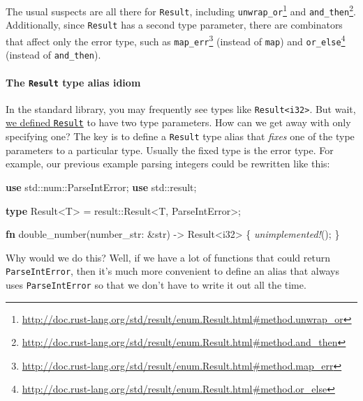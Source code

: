 \documentclass[a4paper,]{book}
\newenvironment{Shaded}{\begin{snugshade}}{\end{snugshade}}
\newcommand{\KeywordTok}[1]{\textcolor[rgb]{0.13,0.29,0.53}{\textbf{{#1}}}}
\newcommand{\DataTypeTok}[1]{\textcolor[rgb]{0.13,0.29,0.53}{{#1}}}
\newcommand{\PreprocessorTok}[1]{\textcolor[rgb]{0.56,0.35,0.01}{\textit{{#1}}}}
\newcommand{\NormalTok}[1]{{#1}}
\renewcommand{\href}[2]{#2\footnote{\url{#1}}}
\let\oldparagraph\paragraph
\renewcommand{\paragraph}[1]{\oldparagraph{#1}\mbox{}}
\begin{document}
The usual suspects are all there for \texttt{Result}, including
\href{http://doc.rust-lang.org/std/result/enum.Result.html\#method.unwrap_or}{\texttt{unwrap\_or}}
and
\href{http://doc.rust-lang.org/std/result/enum.Result.html\#method.and_then}{\texttt{and\_then}}.
Additionally, since \texttt{Result} has a second type parameter, there
are combinators that affect only the error type, such as
\href{http://doc.rust-lang.org/std/result/enum.Result.html\#method.map_err}{\texttt{map\_err}}
(instead of \texttt{map}) and
\href{http://doc.rust-lang.org/std/result/enum.Result.html\#method.or_else}{\texttt{or\_else}}
(instead of \texttt{and\_then}).

\hypertarget{the-result-type-alias-idiom}{\paragraph{\texorpdfstring{The
\texttt{Result} type alias
idiom}{The Result type alias idiom}}\label{the-result-type-alias-idiom}}

In the standard library, you may frequently see types like
\texttt{Result\textless{}i32\textgreater{}}. But wait,
\protect\hyperlink{code-result-def}{we defined \texttt{Result}} to have
two type parameters. How can we get away with only specifying one? The
key is to define a \texttt{Result} type alias that \emph{fixes} one of
the type parameters to a particular type. Usually the fixed type is the
error type. For example, our previous example parsing integers could be
rewritten like this:

\begin{Shaded}
\begin{Highlighting}[]
\KeywordTok{use} \NormalTok{std::num::ParseIntError;}
\KeywordTok{use} \NormalTok{std::result;}

\KeywordTok{type} \NormalTok{Result<T> = result::}\DataTypeTok{Result}\NormalTok{<T, ParseIntError>;}

\KeywordTok{fn} \NormalTok{double_number(number_str: &}\DataTypeTok{str}\NormalTok{) -> }\DataTypeTok{Result}\NormalTok{<}\DataTypeTok{i32}\NormalTok{> \{}
    \PreprocessorTok{unimplemented!}\NormalTok{();}
\NormalTok{\}}
\end{Highlighting}
\end{Shaded}

Why would we do this? Well, if we have a lot of functions that could
return \texttt{ParseIntError}, then it's much more convenient to define
an alias that always uses \texttt{ParseIntError} so that we don't have
to write it out all the time.
\end{document}
